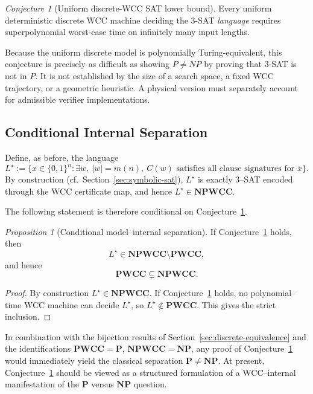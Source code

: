 \documentclass[12pt]{article}
\renewcommand{\P}{\mathbf{P}}
\newcommand{\NP}{\mathbf{NP}}
\newcommand{\PWCC}{\mathbf{PWCC}}
\newcommand{\NPWCC}{\mathbf{NPWCC}}
\theoremstyle{remark}
\newtheorem{proposition}[theorem]{Proposition}
\newtheorem{conjecture}[theorem]{Conjecture}
\begin{document}
\begin{conjecture}[Uniform discrete-WCC SAT lower bound]
\label{conj:wcc_depth}
Every uniform deterministic discrete WCC machine deciding the
$3$-SAT \emph{language} requires superpolynomial worst-case time
on infinitely many input lengths.
\end{conjecture}
\noindent Because the uniform discrete model is polynomially
Turing-equivalent, this conjecture is precisely as difficult as
showing $P\ne NP$ by proving that $3$-SAT is not in $P$.
It is not established by the size of a search space, a fixed
WCC trajectory, or a geometric heuristic. A physical version
must separately account for admissible verifier implementations.

\subsection{Conditional Internal Separation}

Define, as before, the language
\[
L^\star := \bigl\{
x \in \{0,1\}^n : \exists w, \ |w| = m(n), \ C(w)
\text{ satisfies all clause signatures for } x
\bigr\}.
\]
By construction (cf.\ Section~\ref{sec:symbolic-sat}), $L^\star$ is exactly 3–SAT
encoded through the WCC certificate map, and hence $L^\star \in \NPWCC$.

The following statement is therefore conditional on
Conjecture~\ref{conj:wcc_depth}.

\begin{proposition}[Conditional model–internal separation]
\label{prop:internal_sep_conditional}
If Conjecture~\ref{conj:wcc_depth} holds, then
\[
L^\star \in \NPWCC \setminus \PWCC,
\]
and hence
\[
\PWCC \subsetneq \NPWCC.
\]
\end{proposition}

\begin{proof}
By construction $L^\star \in \NPWCC$. If
Conjecture~\ref{conj:wcc_depth} holds, no polynomial–time WCC machine can
decide $L^\star$, so $L^\star \notin \PWCC$. This gives the strict inclusion.
\end{proof}

In combination with the bijection results of Section~\ref{sec:discrete-equivalence} and
the identifications $\PWCC = \P$, $\NPWCC = \NP$, any proof of
Conjecture~\ref{conj:wcc_depth} would immediately yield the classical
separation $\P \neq \NP$. At present, Conjecture~\ref{conj:wcc_depth} should
be viewed as a structured formulation of a WCC–internal manifestation of
the $\P$ versus $\NP$ question.
\end{document}
